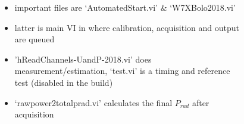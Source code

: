 \documentclass{beamer}
\begin{document}
\begin{frame}
\begin{columns}
\begin{figure}
        \end{figure}%
        \begin{block}{}%
          \begin{itemize}%
            \item{important files are `AutomatedStart.vi' \& `W7XBolo2018.vi'}%
            \item{latter is main VI in where %
                  calibration, acquisition and output are queued}%
            \item{'hReadChannels-UandP-2018.vi' does measurement/estimation, %
                  `test.vi' is a timing and reference test (disabled in the %
                  build)}%
            \item{`rawpower2totalprad.vi' calculates the final 
                  $P_{rad}$ after acquisition}%
          \end{itemize}%
        \end{block}%
      \end{columns}%
  \end{frame}%
\end{document}
